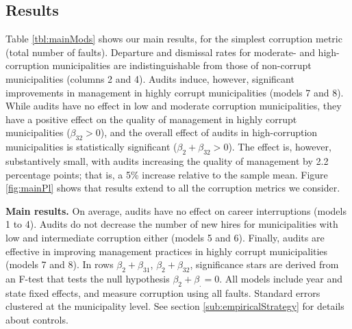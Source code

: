 \subsection{Results}
\label{sub:results}

Table \ref{tbl:mainMods} shows our main results, for the simplest corruption metric (total number of faults). Departure and dismissal rates for moderate- and high-corruption municipalities are indistinguishable from those of non-corrupt municipalities (columns 2 and 4). %
Audits induce, however, significant improvements in management in highly corrupt municipalities (models 7 and 8). While audits have no effect in low and moderate corruption municipalities, they have a positive effect on the quality of management in highly corrupt municipalities ($\beta_{32} > 0$), and the overall effect of audits in high-corruption municipalities is statistically significant ($\beta_2 + \beta_{32} > 0$). The effect is, however, substantively small, with audits increasing the quality of management by 2.2 percentage points; that is, a 5\% increase relative to the sample mean. Figure \ref{fig:mainPl} shows that results extend to all the corruption metrics we consider. 

\begin{landscape}
    \begin{table}[t]
        \centering
        \footnotesize
        
        \caption{{\bf Main results.} On average, audits have no effect on career interruptions (models 1 to 4). Audits do not decrease the number of new hires for municipalities with low and intermediate corruption either (models 5 and 6). Finally, audits are effective in improving management practices in highly corrupt municipalities (models 7 and 8). In rows $\beta_2 + \beta_{31}$, $\beta_2 + \beta_{32}$, significance stars are derived from an F-test that tests the null hypothesis $\beta_2 + \beta_. = 0$. All models include year and state fixed effects, and measure corruption using all faults. Standard errors clustered at the municipality level. See section \ref{sub:empiricalStrategy} for details about controls.}
        \label{tbl:mainMods}
    \end{table}    
\end{landscape}

